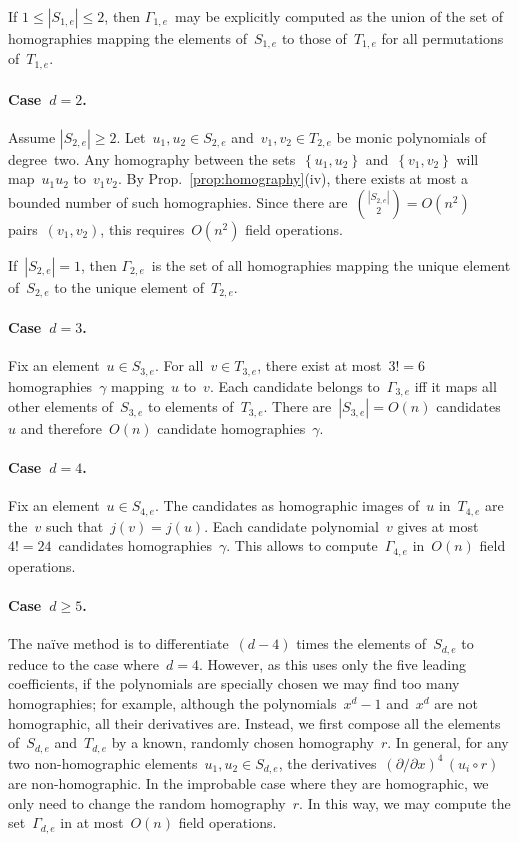 \documentclass{article}%
\def\acco#1{\left\{#1\right\}}
\def\abs#1{\left|#1\right|}
\def\card#1{\abs{#1}}
\begin{document}
If $1 ≤ \card{S_{1,e}} ≤ 2$, then $Γ_{1,e}$~may be explicitly computed as
the union of the set of homographies mapping the elements of~$S_{1,e}$ to
those of~$T_{1,e}$ for all permutations of~$T_{1,e}$.

\paragraph{Case~$d = 2$.}
Assume $\card{S_{2,e}} ≥ 2$. Let~$u_1, u_2 ∈ S_{2,e}$ and~$v_1, v_2 ∈
T_{2,e}$ be monic polynomials of degree~two. Any homography between the
sets~$\acco{u_1, u_2}$ and~$\acco{v_1, v_2}$ will map~$u_1 u_2$ to~$v_1
v_2$. By Prop.~\ref{prop:homography}(iv), there exists at most a bounded
number of such homographies. Since there are~$\binom{\card{S_{2,e}}}{2} =
O(n^2)$ pairs~$(v_1, v_2)$, this requires~$O(n^2)$ field operations.

If~$\card{S_{2,e}} = 1$, then $Γ_{2,e}$~is the set of all homographies
mapping the unique element of~$S_{2,e}$ to the unique element
of~$T_{2,e}$.

\paragraph{Case~$d = 3$.}
Fix an element~$u ∈ S_{3,e}$. For all~$v ∈ T_{3,e}$, there exist at
most~$3! = 6$ homographies~$γ$ mapping~$u$ to~$v$. Each candidate belongs
to~$Γ_{3,e}$ iff it maps all other elements of~$S_{3,e}$ to elements
of~$T_{3,e}$. There are~$\card{S_{3,e}} = O(n)$ candidates~$u$ and
therefore~$O(n)$ candidate homographies~$γ$.

\paragraph{Case~$d = 4$.}
Fix an element~$u ∈ S_{4,e}$. The candidates as homographic images of~$u$
in~$T_{4,e}$ are the~$v$ such that~$j(v) = j(u)$. Each candidate
polynomial~$v$ gives at most $4! = 24$~candidates homographies~$γ$. This
allows to compute~$Γ_{4,e}$ in~$O(n)$ field operations.

\paragraph{Case~$d ≥ 5$.} The naïve method is to differentiate~$(d-4)$
times the elements of~$S_{d,e}$ to reduce to the case where~$d = 4$.
However, as this uses only the five leading coefficients, if the
polynomials are specially chosen we may find too many homographies; for
example, although the polynomials~$x^d-1$ and~$x^d$ are not homographic,
all their derivatives are. Instead, we first compose all the elements
of~$S_{d,e}$ and~$T_{d,e}$ by a known, randomly chosen homography~$r$. In
general, for any two non-homographic elements~$u_1, u_2 ∈ S_{d,e}$, the
derivatives~$(∂/∂x)^4\, (u_i ∘ r)$ are non-homographic. In the improbable
case where they are homographic, we only need to change the random
homography~$r$. In this way, we may compute the set~$Γ_{d,e}$ in at
most~$O(n)$ field operations.
\end{document}

